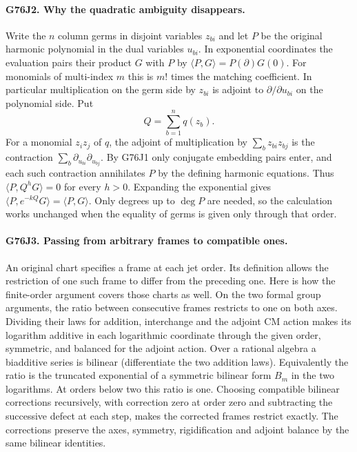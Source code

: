 \paragraph{G76J2. Why the quadratic ambiguity disappears.}
Write the $n$ column germs in disjoint variables $z_{bi}$ and let
$P$ be the original harmonic polynomial in the dual variables
$u_{bi}$. In exponential coordinates the evaluation pairs their product
$G$ with $P$ by $\langle P,G\rangle=P(\partial)G(0)$. For monomials
of multi-index $m$ this is $m!$ times the matching coefficient. In
particular multiplication on the germ side by $z_{bi}$ is adjoint to
$\partial/\partial u_{bi}$ on the polynomial side. Put
\[
 Q=\sum_{b=1}^n q(z_b).
\]
For a monomial $z_i z_j$ of $q$, the adjoint of multiplication by
$\sum_b z_{bi}z_{bj}$ is the contraction
$\sum_b\partial_{u_{bi}}\partial_{u_{bj}}$. By G76J1 only
conjugate embedding pairs enter, and each such contraction annihilates
$P$ by the defining harmonic equations. Thus
$\langle P,Q^hG\rangle=0$ for every $h>0$. Expanding the exponential
gives $\langle P,e^{-kQ}G\rangle=\langle P,G\rangle$.
Only degrees up to $\deg P$ are needed, so the calculation works
unchanged when the equality of germs is given only through that order.

\paragraph{G76J3. Passing from arbitrary frames to compatible ones.}
An original chart specifies a frame at each jet order. Its definition
allows the restriction of one such frame to differ from the preceding
one. Here is how the finite-order argument covers those charts as well.
On the two formal group arguments, the ratio between consecutive frames
restricts to one on both axes. Dividing their laws for addition,
interchange and the adjoint CM action makes its logarithm additive
in each logarithmic coordinate through the given order, symmetric,
and balanced for the adjoint action. Over a rational algebra a
biadditive series is bilinear (differentiate the two addition laws).
Equivalently the ratio is the truncated exponential of a symmetric
bilinear form $B_m$ in the two logarithms. At orders below two this
ratio is one. Choosing compatible bilinear corrections recursively,
with correction zero at order zero and subtracting the successive
defect at each step, makes the corrected frames restrict exactly.
The corrections preserve the axes, symmetry, rigidification and
adjoint balance by the same bilinear identities.


